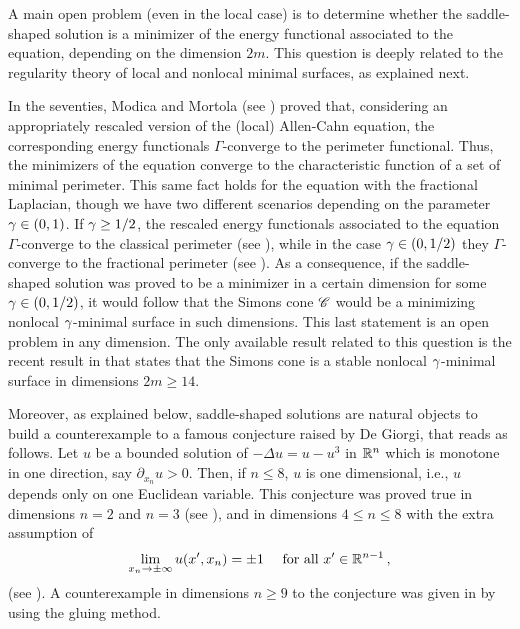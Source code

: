 A main open problem (even in the local case) is to determine whether the saddle-shaped solution is a minimizer of the energy functional associated to the equation, depending on the dimension $2m$. This question is deeply related to the regularity theory of local and nonlocal minimal surfaces, as explained next.

In the seventies, Modica and Mortola (see \cite{Modica,ModicaMortola}) proved that, considering an appropriately rescaled version of the (local) Allen-Cahn equation, the corresponding energy functionals $\Gamma$-converge to the perimeter functional. Thus, the minimizers of the equation converge to the characteristic function of a set of minimal perimeter. This same fact holds for the equation with the fractional Laplacian, though we have two different scenarios depending on the parameter $\gamma \in (0,1)$. If $\gamma \geq 1/2$, the rescaled energy functionals associated to the equation $\Gamma$-converge to the classical perimeter (see \cite{GiovanniBouchitteSeppecher,Gonzalez}), while in the case $\gamma \in (0,1/2)$ they $\Gamma$-converge to the fractional perimeter (see \cite{SavinValdinoci-GammaConvergence}). As a consequence, if the saddle-shaped solution was proved to be a minimizer in a certain dimension for some $\gamma \in (0,1/2)$, it would follow that the Simons cone $\mathscr{C}$ would be a minimizing nonlocal $\gamma$-minimal surface in such dimensions. This last statement is an open problem in any dimension. The only available result related to this question is the recent result in \cite{Felipe-Sanz-Perela:SaddleFractional} that states that the Simons cone is a stable nonlocal $\gamma$-minimal surface in dimensions $2m\geq 14$.


Moreover, as explained below, saddle-shaped solutions are natural objects to build a counterexample to a famous conjecture raised by De Giorgi, that reads as follows. Let $u$ be a bounded solution of $-\Delta  u = u - u^3$ in $\mathbb{R}^n$ which is monotone in one direction, say $\partial_{x_n} u > 0$. Then, if $n\leq 8$, $u$ is one dimensional, i.e., $u$ depends only on one Euclidean variable. This conjecture was proved true in dimensions $n=2$ and  $n=3$ (see \cite{GhoussoubGui,AmbrosioCabre}), and in dimensions $4\leq n \leq 8$ with the extra assumption of
\begin{equation}
\label{Eq:SavinCondition}
\lim_{x_n \to \pm \infty} u(x',x_n) = \pm 1 \quad \text{ for all } x'\in \mathbb{R}^{n-1}\,,
\end{equation}
(see \cite{Savin-DeGiorgi}). A counterexample in dimensions $n\geq 9$ to the conjecture was given in \cite{delPinoKowalczykWei} by using the gluing method. 

